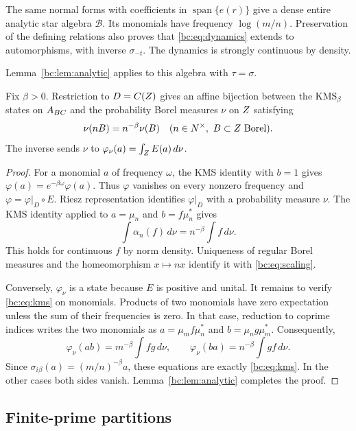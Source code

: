 The same normal forms with coefficients in \(\operatorname{span}\{e(r)\}\)
give a dense entire analytic star algebra \(\mathcal B\). Its monomials
have frequency \(\log(m/n)\). Preservation of the defining relations
also proves that \eqref{bc:eq:dynamics} extends to automorphisms, with
inverse \(\sigma_{-t}\). The dynamics is strongly continuous by density.

Lemma~\ref{bc:lem:analytic} applies to this algebra with \(\tau=\sigma\).

\begin{theorem}\label{bc:thm:measures}
Fix \(\beta>0\). Restriction to \(D=C(Z)\) gives an affine bijection
between the KMS\(_\beta\) states on \(A_{BC}\) and the probability
Borel measures \(\nu\) on \(Z\) satisfying
\begin{equation}\label{bc:eq:scaling}
 \nu(nB)=n^{-\beta}\nu(B)
 \quad(n\in N^{\times},\ B\subset Z\text{ Borel}).
\end{equation}
The inverse sends \(\nu\) to
\(\varphi_\nu(a)=\int_{Z}E(a)\,d\nu\).
\end{theorem}

\begin{proof}
For a monomial \(a\) of frequency \(\omega\), the KMS identity with
\(b=1\) gives \(\varphi(a)=e^{-\beta\omega}\varphi(a)\).
Thus \(\varphi\) vanishes on every nonzero frequency and
\(\varphi=\varphi|_D\circ E\). Riesz representation identifies
\(\varphi|_D\) with a probability measure \(\nu\).
The KMS identity applied to \(a=\mu_n\) and \(b=f\mu_n^*\) gives
\[
 \int\alpha_n(f)\,d\nu=n^{-\beta}\int f\,d\nu.
\]
This holds for continuous \(f\) by norm density. Uniqueness of regular
Borel measures and the homeomorphism \(x\mapsto nx\) identify it
with \eqref{bc:eq:scaling}.

Conversely, \(\varphi_\nu\) is a state because \(E\) is positive and
unital. It remains to verify \eqref{bc:eq:kms} on monomials.
Products of two monomials have zero expectation unless the sum of
their frequencies is zero. In that case, reduction to
coprime indices writes the two monomials as
\(a=\mu_mf\mu_n^*\) and \(b=\mu_ng\mu_m^*\). Consequently,
\[
 \varphi_\nu(ab)=m^{-\beta}\int fg\,d\nu,
 \qquad
 \varphi_\nu(ba)=n^{-\beta}\int gf\,d\nu.
\]
Since \(\sigma_{i\beta}(a)=(m/n)^{-\beta}a\), these equations are
exactly \eqref{bc:eq:kms}. In the other cases both sides vanish.
Lemma~\ref{bc:lem:analytic} completes the proof.
\end{proof}

\subsection{Finite-prime partitions}

